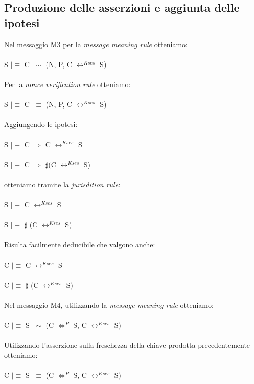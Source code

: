 \documentclass[12pt, a4paper]{article}
\begin{document}
\subsection{Produzione delle asserzioni e aggiunta delle ipotesi}
Nel messaggio M3 per la \textit{message meaning rule} otteniamo:\\\\
S $\mid\equiv$ C $\mid\sim$ (N, P, C $\longleftrightarrow^{Kses}$ S)\\\\
Per la \textit{nonce verification rule} otteniamo:\\\\
S $\mid\equiv$ C $\mid\equiv$ (N, P, C $\longleftrightarrow^{Kses}$ S)\\\\
Aggiungendo le ipotesi:\\\\
S $\mid\equiv$ C $\Rightarrow$ C $\longleftrightarrow^{Kses}$ S\\\\
S $\mid\equiv$ C $\Rightarrow$ $\sharp$(C $\longleftrightarrow^{Kses}$ S)\\\\
otteniamo tramite la \textit{jurisdition rule}:\\\\
S $\mid\equiv$ C $\longleftrightarrow^{Kses}$ S\\\\
S $\mid\equiv$ $\sharp$ (C $\longleftrightarrow^{Kses}$ S)\\\\
Risulta facilmente deducibile che valgono anche:\\\\
C $\mid\equiv$ C $\longleftrightarrow^{Kses}$ S\\\\
C $\mid\equiv$ $\sharp$ (C $\longleftrightarrow^{Kses}$ S)\\\\
Nel messaggio M4, utilizzando la \textit{message meaning rule} otteniamo:\\\\
C $\mid\equiv$ S $\mid\sim$ (C $\Longleftrightarrow^{P}$ S, C $\longleftrightarrow^{Kses}$ S)\\\\
Utilizzando l'asserzione sulla freschezza della chiave prodotta precedentemente otteniamo:\\\\
C $\mid\equiv$ S $\mid\equiv$ (C $\Longleftrightarrow^{P}$ S, C $\longleftrightarrow^{Kses}$ S)
\end{document}
